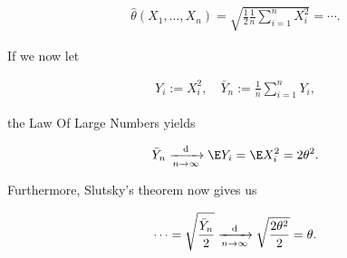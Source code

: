 \begin{solution}
\begin{enumerate}[label = (\alph*)]
    \begin{align*}
        \hat \theta(X_1, \dots, X_n)
        =
        \sqrt
        {
            \frac{1}{2}
            \frac{1}{n}
            \sum_{i=1}^n
                X_i^2
        }
        =
        \cdots.
    \end{align*}

    If we now let

    \begin{align*}
        Y_i := X_i^2,
        \quad
        \bar Y_n := \frac{1}{n} \sum_{i=1}^n Y_i,
    \end{align*}

    the Law Of Large Numbers yields

    \begin{align*}
        \bar Y_n \xrightarrow[n \to \infty]{\text d} \E Y_i = \E X_i^2 = 2 \theta^2.
    \end{align*}

    Furthermore, Slutsky's theorem now gives us

    \begin{align*}
        \cdots
        =
        \sqrt \frac{\bar Y_n}{2}
        \xrightarrow[n \to \infty]{\text d}
        \sqrt \frac{2 \theta^2}{2}
        =
        \theta.
    \end{align*}

\end{enumerate}

\end{solution}

